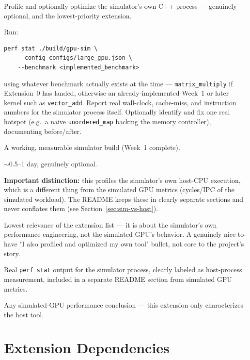 \documentclass[11pt]{article}
\begin{document}
\begin{description}[leftmargin=1.2cm]
  \item[Purpose] Profile and optionally optimize the simulator's own C++
  process --- genuinely optional, and the lowest-priority extension.
  \item[Implementation] Run:
\begin{lstlisting}
perf stat ./build/gpu-sim \
    --config configs/large_gpu.json \
    --benchmark <implemented_benchmark>
\end{lstlisting}
  using whatever benchmark actually exists at the time --- \texttt{matrix\_multiply}
  if Extension~0 has landed, otherwise an already-implemented Week~1 or
  later kernel such as \texttt{vector\_add}. Report real wall-clock,
  cache-miss, and instruction numbers for the simulator process itself.
  Optionally identify and fix one real hotspot (e.g.\ a naive
  \texttt{unordered\_map} backing the memory controller), documenting
  before/after.
  \item[Dependencies] A working, measurable simulator build (Week~1
  complete).
  \item[Estimated effort] $\sim$0.5--1 day, genuinely optional.
  \item[Design notes] \textbf{Important distinction:} this profiles the
  simulator's own host-CPU execution, which is a different thing from the
  simulated GPU metrics (cycles/IPC of the simulated workload). The
  README keeps these in clearly separate sections and never conflates
  them (see Section~\ref{sec:sim-vs-host}).
  \item[Why it matters/last] Lowest relevance of the extension list --- it
  is about the simulator's own performance engineering, not the simulated
  GPU's behavior. A genuinely nice-to-have "I also profiled and optimized
  my own tool" bullet, not core to the project's story.
  \item[Proof of done] Real \texttt{perf stat} output for the simulator
  process, clearly labeled as host-process measurement, included in a
  separate README section from simulated GPU metrics.
  \item[Does not claim] Any simulated-GPU performance conclusion --- this
  extension only characterizes the host tool.
\end{description}

\section{Extension Dependencies}
\end{document}
